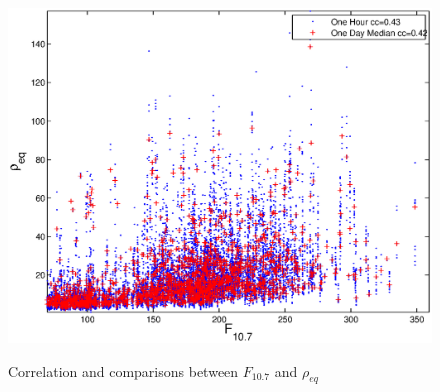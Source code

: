\documentclass[10pt,twocolumn]{article}
\begin{document}
\begin{figure}[htp!]
{\includegraphics[scale=0.42]{paperfigures/F107vsMD.eps}}
\caption{Correlation and comparisons between $F_{10.7}$ and $\rho_{eq}$}
\label{ccplot}
\end{figure}
\clearpage
\end{document}
